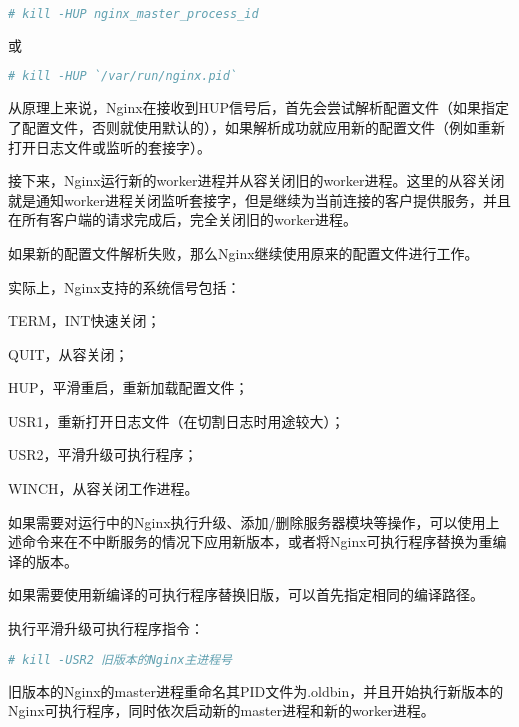 \begin{lstlisting}[language=bash]
# kill -HUP nginx_master_process_id
\end{lstlisting}

或

\begin{lstlisting}[language=bash]
# kill -HUP `/var/run/nginx.pid`
\end{lstlisting}

从原理上来说，Nginx在接收到HUP信号后，首先会尝试解析配置文件（如果指定了配置文件，否则就使用默认的），如果解析成功就应用新的配置文件（例如重新打开日志文件或监听的套接字）。

接下来，Nginx运行新的worker进程并从容关闭旧的worker进程。这里的从容关闭就是通知worker进程关闭监听套接字，但是继续为当前连接的客户提供服务，并且在所有客户端的请求完成后，完全关闭旧的worker进程。

如果新的配置文件解析失败，那么Nginx继续使用原来的配置文件进行工作。


实际上，Nginx支持的系统信号包括：

\begin{compactenum}
\item TERM，INT快速关闭；
\item QUIT，从容关闭；
\item HUP，平滑重启，重新加载配置文件；
\item USR1，重新打开日志文件（在切割日志时用途较大）；
\item USR2，平滑升级可执行程序；
\item WINCH，从容关闭工作进程。
\end{compactenum}


如果需要对运行中的Nginx执行升级、添加/删除服务器模块等操作，可以使用上述命令来在不中断服务的情况下应用新版本，或者将Nginx可执行程序替换为重编译的版本。

\begin{compactenum}
\item 如果需要使用新编译的可执行程序替换旧版，可以首先指定相同的编译路径。

\item 执行平滑升级可执行程序指令：

\begin{lstlisting}[language=bash]
# kill -USR2 旧版本的Nginx主进程号
\end{lstlisting}

\item 旧版本的Nginx的master进程重命名其PID文件为.oldbin，并且开始执行新版本的Nginx可执行程序，同时依次启动新的master进程和新的worker进程。

\end{compactenum}

